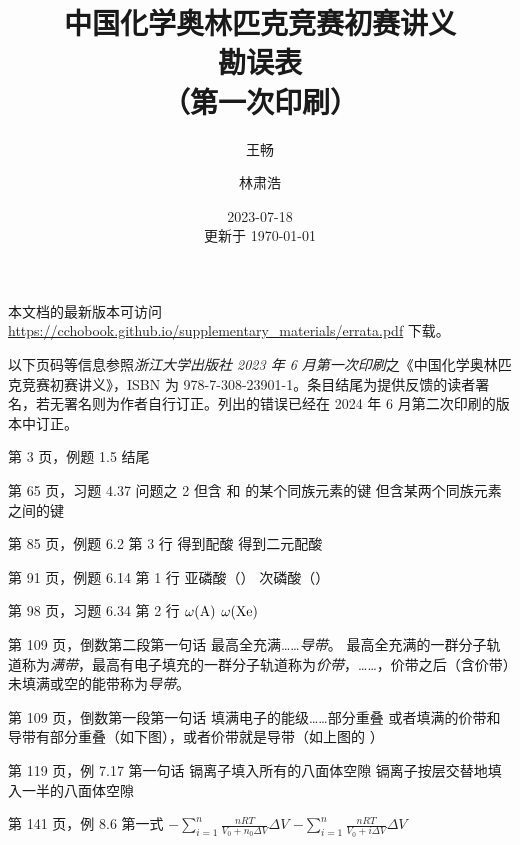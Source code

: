 \documentclass{errata}
\title{中国化学奥林匹克竞赛初赛讲义 \\ {\bfseries 勘误表} \\ （第一次印刷）}
\author{王畅 \and 林肃浩}
\date{2023-07-18 \\ 更新于 \today}
\begin{document}
    \maketitle
    本文档的最新版本可访问 \url{https://cchobook.github.io/supplementary_materials/errata.pdf} 下载。

    以下页码等信息参照\emph{浙江大学出版社 2023 年 6 月第一次印刷}之《中国化学奥林匹克竞赛初赛讲义》，ISBN 为 978-7-308-23901-1。条目结尾为提供反馈的读者署名，若无署名则为作者自行订正。列出的错误已经在 2024 年 6 月第二次印刷的版本中订正。

    \begin{Errata}
        \item[第 3 页，例题 1.5 结尾]
            \Orig {}
            \Corr {}
        \item[第 65 页，习题 4.37 问题之 2 \cite{otten2009complexation}]
            \Orig 但含  和  的某个同族元素的键
            \Corr 但含某两个同族元素之间的键
        \item[第 85 页，例题 6.2 第 3 行]
            \Orig 得到配酸 
            \Corr 得到二元配酸 
        \item[第 91 页，例题 6.14 第 1 行]
            \Orig 亚磷酸（）
            \Corr 次磷酸（）
        \item[第 98 页，习题 6.34 第 2 行]
            \Orig $\omega(\ce{A})$
            \Corr $\omega(\ce{Xe})$
        \item[第 109 页，倒数第二段第一句话]
            \Orig 最高全充满……\emph{导带}。
            \Corr 最高全充满的一群分子轨道称为\emph{满带}，最高有电子填充的一群分子轨道称为\emph{价带}，……，价带之后（含价带）未填满或空的能带称为\emph{导带}。
        \item[第 109 页，倒数第一段第一句话]
            \Orig 填满电子的能级……部分重叠
            \Corr 或者填满的价带和导带有部分重叠（如下图），或者价带就是导带（如上图的 ）
        \item[第 119 页，例 7.17 第一句话]
            \Orig 镉离子填入所有的八面体空隙
            \Corr 镉离子按层交替地填入一半的八面体空隙
        \item[第 141 页，例 8.6 第一式]
            \Orig $-\sum_{i=1}^n \frac{nRT}{V_0+n_0 \Delta V} \Delta V$
            \Corr $-\sum_{i=1}^n \frac{nRT}{V_0+i \Delta V} \Delta V$

\end{Errata}
\end{document}
